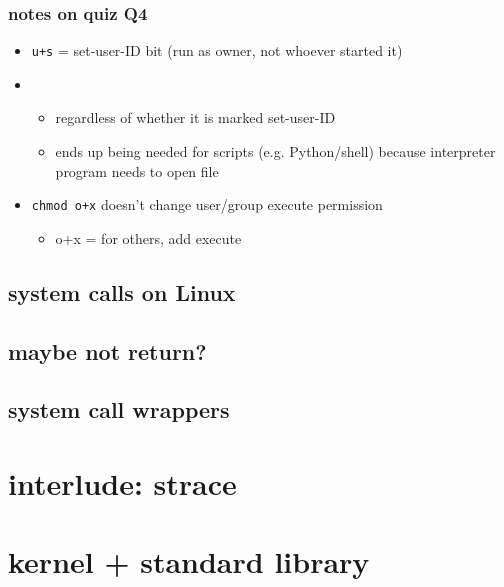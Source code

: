 \begin{frame}
\frametitle{notes on quiz Q4}
\begin{itemize}
\item \texttt{u+s} = set-user-ID bit (run as owner, not whoever started it)
\item {}
    \begin{itemize}
    \item regardless of whether it is marked set-user-ID
    \item ends up being needed for scripts (e.g. Python/shell) because interpreter program needs to open file
    \end{itemize}
\item \texttt{chmod o+x} doesn't change user/group execute permission
    \begin{itemize}
    \item o+x = for others, add execute
    \end{itemize}
\end{itemize}
\end{frame}





\subsection{system calls on Linux}


\subsection{maybe not return?}



\subsection{system call wrappers}

% 

\section{interlude: strace}


\section{kernel + standard library}

